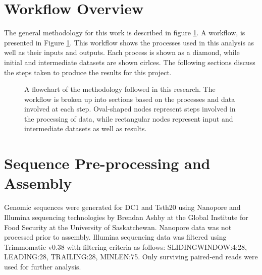 \section{Workflow Overview}

The general methodology for this work is described in figure
\ref{fig:workflow}. A workflow, is presented in Figure
\ref{fig:workflow}. This workflow shows the processes used in this
analysis as well as their inputs and outputs. Each process is shown as
a diamond, while initial and intermediate datasets are shown
cirlces. The following sections discuss the steps taken to produce the
results for this project.

\begin{figure}
  \centering
  \caption{A flowchart of the methodology followed in this
    research. The workflow is broken up into sections based on the
    processes and data involved at each step. Oval-shaped nodes
    represent steps involved in the processing of data, while
    rectangular nodes represent input and intermediate datasets as
    well as results.}
  \label{fig:workflow}
\end{figure}


\section{Sequence Pre-processing and Assembly}


Genomic sequences were generated for DC1 and Tsth20 using
Nanopore\cite{Wang2021} and Illumina\cite{Bennett2004} sequencing
technologies by Brendan Ashby at the Global Institute for Food
Security at the University of Saskatchewan. Nanopore data was not
processed prior to assembly. Illumina sequencing data was filtered
using Trimmomatic v0.38\cite{Bolger2014} with filtering criteria as
follows: SLIDINGWINDOW:4:28, LEADING:28, TRAILING:28, MINLEN:75. Only
surviving paired-end reads were used for further analysis.

